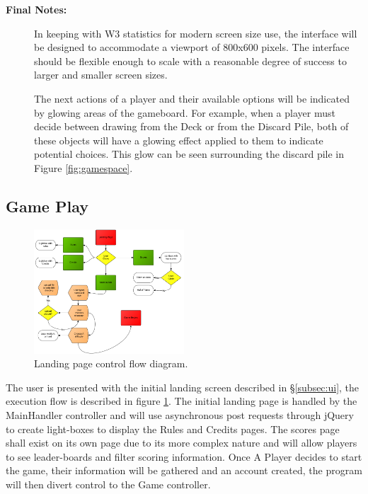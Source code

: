 \documentclass[12pt]{IEEEtran}
\begin{document}
\begin{description}
	\item[\textbf{Final Notes:}] \hspace{3em} In keeping with W3 statistics for modern screen size use, the interface will be designed to accommodate a viewport of 800x600 pixels. The interface should be flexible enough to scale with a reasonable degree of success to larger and smaller screen sizes. 
	
	The next actions of a player and their available options will be indicated by glowing areas of the gameboard. For example, when a player must decide between drawing from the Deck or from the Discard Pile, both of these objects will have a glowing effect applied to them to indicate potential choices. This glow can be seen surrounding the discard pile in Figure \ref{fig:gamespace}. 
	
	\end{description}

\subsection{Game Play}
\label{subsec:gameplay}

	\begin{figure}[h]
		\centering
		\includegraphics[width=0.5\textwidth]{landingpage.png}
		\caption{Landing page control flow diagram. }
		\label{fig:landingpage}
	\end{figure}

	The user is presented with the initial landing screen described in \S\ref{subsec:ui}, the execution flow is described in figure \ref{fig:landingpage}. The initial landing page is handled by the MainHandler controller and will use asynchronous post requests through jQuery to create light-boxes to display the Rules and Credits pages. The scores page shall exist on its own page due to its more complex nature and will allow players to see leader-boards and filter scoring information. Once A Player decides to start the game, their information will be gathered and an account created, the program will then divert control to the Game controller.
\end{document}
